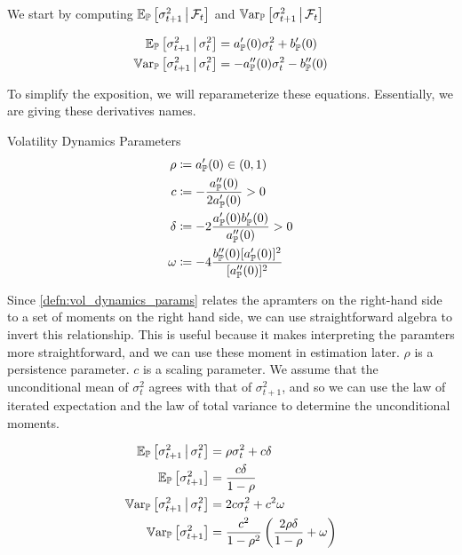 \documentclass[11pt, letterpaper, twoside, final]{article}
\begin{document}
We start by computing $\operatorname{\mathbb{E}}_{\mathbb{P}}\left[\sigma^2_{t+1} \,\middle\vert\, \mathcal{F}_t\right]$ and $\operatorname{\mathbb{V}ar}_{\mathbb{P}}\left[\sigma^2_{t+1} \,\middle\vert\,
\mathcal{F}_t\right]$


\begin{align}
    \operatorname{\mathbb{E}}_{\mathbb{P}}\left[\sigma^2_{t+1} \,\middle\vert\, \sigma^2_t \right]  &= a_{\mathbb{P}}'(0) \sigma^2_t  + b_{\mathbb{P}}'(0) \\
    \operatorname{\mathbb{V}ar}_{\mathbb{P}}\left[\sigma^2_{t+1} \,\middle\vert\, \sigma^2_t \right]  &= -a_{\mathbb{P}}''(0) \sigma^2_t  - b_{\mathbb{P}}''(0) 
\end{align}

To simplify the exposition, we will reparameterize these equations. 
Essentially, we are giving these derivatives names.

\begin{defn}{Volatility Dynamics Parameters}
    \label{defn:vol_dynamics_params}
    \begin{align}
        \rho &\coloneqq a_{\mathbb{P}}'(0) \in (0,1) \\
        c &\coloneqq - \frac{a_{\mathbb{P}}''(0)}{2 a_{\mathbb{P}}'(0)} > 0 \\
        \delta &\coloneqq -2 \frac{a_{\mathbb{P}}'(0) b_{\mathbb{P}}'(0)}{a_{\mathbb{P}}''(0)} > 0 \\
        \omega &\coloneqq -4 \frac{b_{\mathbb{P}}''(0) [a_{\mathbb{P}}'(0)]^2}{[a_{\mathbb{P}}''(0)]^2}
    \end{align}
\end{defn}

Since \cref{defn:vol_dynamics_params} relates the apramters on the right-hand side to a set of moments on the
right hand side, we can use straightforward algebra to invert this relationship.
This is useful because it makes interpreting the paramters more straightforward, and we can use these moment in
estimation later. 
$\rho$ is a persistence parameter.
$c$ is a scaling parameter.
We assume that the unconditional mean of $\sigma^2_t$ agrees with that of $\sigma^2_{t+1}$, and so we can use the
law of iterated expectation and the law of total variance to determine the unconditional moments.

\begin{remark} 
    \label{remark:vol_moment_conditions}
    \begin{align}
        \E_{\PP}\left[\sigma^2_{t+1} \mvert \sigma^2_t \right]  &= \rho \sigma^2_t  + c \delta\\
%
        \E_{\PP}\left[\sigma^2_{t+1}\right]  &= \frac{c \delta}{1 - \rho} \\
%
        \Var_{\PP}\left[\sigma^2_{t+1} \mvert \sigma^2_t \right]  &=  2 c \sigma^2_t  + c^2 \omega \\
%
        \Var_{\PP}\left[\sigma^2_{t+1} \right]  &=  \frac{c^2}{1- \rho^2} \left(\frac{2 \rho \delta}{1 - \rho}  +
        \omega \right) 
    \end{align}
\end{remark}
\end{document}
